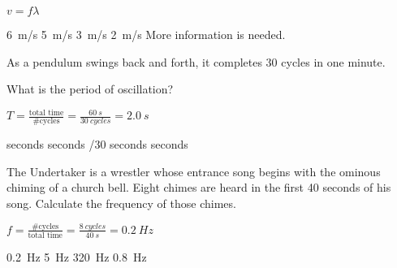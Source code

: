 \documentclass[answers]{exam}
\begin{document}
\begin{questions}
\ifprintanswers
{\color{red}
$v = f\lambda$
}
\fi

\begin{randomizechoices}[keeplast]
    \correctchoice \SI{6}{m/s}
    \choice \SI{5}{m/s}
    \choice \SI{3}{m/s}
    \choice \SI{2}{m/s}
    \choice More information is needed.
\end{randomizechoices}

\question 
As a pendulum swings back and forth, it completes 30 cycles in one minute.

\begin{center}
\end{center}

What is the period of oscillation?

\ifprintanswers
{\color{red}

$T = \frac{\text{total time}}{\text{\# cycles}} = \frac{\SI{60}{s}}{\SI{30}{cycles}} = \boxed{\SI{2.0}{s}}$

\medskip
}
\fi

\begin{randomizechoices}
     seconds
     seconds
    /30 seconds
     seconds
\end{randomizechoices}

\question
The Undertaker is a wrestler whose entrance song begins with the ominous chiming of a church bell. Eight chimes are heard in the first 40 seconds of his song. Calculate the frequency of those chimes. 

\ifprintanswers
{\color{red}

$f = \frac{\text{\# cycles}}{\text{total time}} = \frac{\SI{8}{cycles}}{\SI{40}{s}} = \boxed{\SI{0.2}{Hz}}$

\medskip
}
\fi


\begin{randomizechoices}
    \correctchoice \SI{0.2}{Hz}
    \choice \SI{5}{Hz}
    \choice \SI{320}{Hz}
    \choice \SI{0.8}{Hz}
\end{randomizechoices}


\end{questions}
\end{document}

